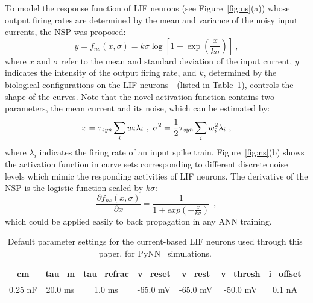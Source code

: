 \documentclass{article}
\begin{document}
	To model the response function of LIF neurons (see Figure~\ref{fig:ns}(a)) whose output firing rates are determined by the mean and variance of the noisy input currents, the NSP was proposed:
	\begin{equation}
	y = f_{ns}(x, \sigma) = k \sigma \log [1 + \exp(\frac{x}{k \sigma})]~,
	\label{equ:nsp}
	\end{equation}
	where $x$ and $\sigma$ refer to the mean and standard deviation of the input current, $y$ indicates the intensity of the output firing rate, and $k$, determined by the biological configurations on the LIF neurons~\cite{liu2016noisy}~(listed in Table~\ref{tbl:pynnConfig}), controls the shape of the curves.
	Note that the novel activation function contains two parameters, the mean current and its noise, which can be estimated by:
	\begin{equation}
	x = \tau_{\textit{\textrm{syn}}}\sum_i w_i\lambda_{i}~, ~\sigma^2=\frac{1}{2}\tau_{\textit{\textrm{syn}}}\sum_i w_i^2\lambda_{i}~,
	\label{equ:distr}
	\end{equation}
	where $\lambda_i$ indicates the firing rate of an input spike train.
	Figure~\ref{fig:ns}(b) shows the activation function in curve sets corresponding to different discrete noise levels which mimic the responding activities of LIF neurons.
	The derivative of the NSP is the logistic function scaled by $k\sigma$:
	\begin{equation}
	\frac{\partial f_{ns}(x,\sigma)}{\partial x} = \frac{1}{1+exp(-\frac{x}{k\sigma})}~~,
	\label{equ:logist}
	\end{equation}	
	which could be applied easily to back propagation in any ANN training.
	
	\begin{table}[thb]
		\centering
		\caption{\label{tbl:pynnConfig}Default parameter settings for the current-based LIF neurons used through this paper, for PyNN~\cite{davison2008pynn} simulations.}
		\bgroup
		\def\arraystretch{1.4}
		\begin{tabular}{c c c c c c c}
			cm & tau\_m & tau\_refrac & v\_reset & v\_rest& v\_thresh & i\_offset \\
			\hline
			0.25 nF & 20.0 ms & 1.0 ms & -65.0 mV & -65.0 mV & -50.0 mV &  0.1 nA 
		\end{tabular}
		\egroup
	\end{table}
	
\end{document}
